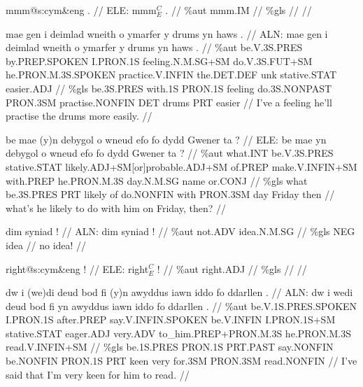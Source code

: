 \documentclass[a4paper,10pt]{article}
\begin{document}
\ex
\begingl[lingstyle=gergl]
\glchat mmm@s:cym\&eng . //
\glsurface ELE:  mmm$^{C}_{E}$ .  //
\glauto \%aut  mmm{\scriptsize .IM}   //
\glmanual \%gls     //
\gleng  //
\endgl
\xe

\ex
\begingl[lingstyle=gergl]
\glchat mae gen i deimlad wneith o ymarfer y drums yn haws . //
\glsurface ALN:  mae gen i deimlad wneith o ymarfer y drums yn haws .  //
\glauto \%aut  be{\scriptsize .V.3S.PRES} by{\scriptsize .PREP.SPOKEN} I{\scriptsize .PRON.1S} feeling{\scriptsize .N.M.SG+SM} do{\scriptsize .V.3S.FUT+SM} he{\scriptsize .PRON.M.3S.SPOKEN} practice{\scriptsize .V.INFIN} the{\scriptsize .DET.DEF} unk stative{\scriptsize .STAT} easier{\scriptsize .ADJ}   //
\glmanual \%gls  be{\scriptsize .3S.PRES} with{\scriptsize .1S} PRON{\scriptsize .1S} feeling do{\scriptsize .3S.NONPAST} PRON{\scriptsize .3SM} practise{\scriptsize .NONFIN} DET drums PRT easier   //
\gleng I've a feeling he'll practise the drums more easily. //
\endgl
\xe

\ex
\begingl[lingstyle=gergl]
\glchat be mae (y)n debygol o wneud efo fo dydd Gwener ta ? //
\glsurface ELE:  be mae yn debygol o wneud efo fo dydd Gwener ta ?  //
\glauto \%aut  what{\scriptsize .INT} be{\scriptsize .V.3S.PRES} stative{\scriptsize .STAT} likely{\scriptsize .ADJ+SM[or]probable.ADJ+SM} of{\scriptsize .PREP} make{\scriptsize .V.INFIN+SM} with{\scriptsize .PREP} he{\scriptsize .PRON.M.3S} day{\scriptsize .N.M.SG} name or{\scriptsize .CONJ}   //
\glmanual \%gls  what be{\scriptsize .3S.PRES} PRT likely of do{\scriptsize .NONFIN} with PRON{\scriptsize .3SM} day Friday then   //
\gleng what's he likely to do with him on Friday, then? //
\endgl
\xe

\ex
\begingl[lingstyle=gergl]
\glchat dim syniad ! //
\glsurface ALN:  dim syniad !  //
\glauto \%aut  not{\scriptsize .ADV} idea{\scriptsize .N.M.SG}   //
\glmanual \%gls  NEG idea   //
\gleng no idea! //
\endgl
\xe

\ex
\begingl[lingstyle=gergl]
\glchat right@s:cym\&eng ! //
\glsurface ELE:  right$^{C}_{E}$ !  //
\glauto \%aut  right{\scriptsize .ADJ}   //
\glmanual \%gls     //
\gleng  //
\endgl
\xe

\ex
\begingl[lingstyle=gergl]
\glchat dw i (we)di deud bod fi (y)n awyddus iawn iddo fo ddarllen . //
\glsurface ALN:  dw i wedi deud bod fi yn awyddus iawn iddo fo ddarllen .  //
\glauto \%aut  be{\scriptsize .V.1S.PRES.SPOKEN} I{\scriptsize .PRON.1S} after{\scriptsize .PREP} say{\scriptsize .V.INFIN.SPOKEN} be{\scriptsize .V.INFIN} I{\scriptsize .PRON.1S+SM} stative{\scriptsize .STAT} eager{\scriptsize .ADJ} very{\scriptsize .ADV} to\_him{\scriptsize .PREP+PRON.M.3S} he{\scriptsize .PRON.M.3S} read{\scriptsize .V.INFIN+SM}   //
\glmanual \%gls  be{\scriptsize .1S.PRES} PRON{\scriptsize .1S} PRT{\scriptsize .PAST} say{\scriptsize .NONFIN} be{\scriptsize .NONFIN} PRON{\scriptsize .1S} PRT keen very for{\scriptsize .3SM} PRON{\scriptsize .3SM} read{\scriptsize .NONFIN}   //
\gleng I've said that I'm very keen for him to read. //
\endgl
\xe
\end{document}
